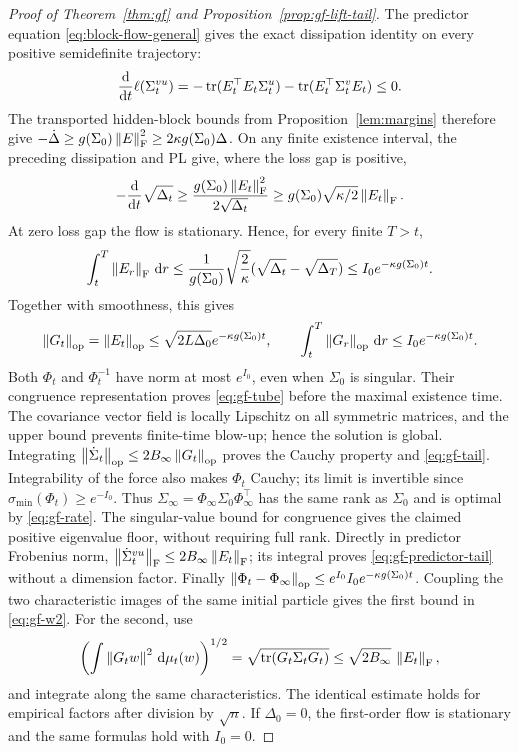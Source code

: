 \begin{proof}[Proof of Theorem~\ref{thm:gf} and Proposition~\ref{prop:gf-lift-tail}]
The predictor equation \eqref{eq:block-flow-general} gives the exact
dissipation identity on every positive semidefinite trajectory:
\begin{equation}\label{eq:flow-dissipation}
\frac{\mathrm{d}}{\mathrm{d}t}\ell(\Sigma^{vu}_t)
=-\operatorname{tr}(E_t^\top E_t\Sigma^u_t)-\operatorname{tr}(E_t^\top\Sigma^v_tE_t)\le0.
\end{equation}
The transported hidden-block bounds from Proposition~\ref{lem:margins}
therefore give $-\dot\Delta\ge g(\Sigma_0)\left\lVert E \right\rVert_{\mathrm{F}}^2\ge2\kappa g(\Sigma_0)\Delta$.
On any finite existence interval, the preceding dissipation and PL give,
where the loss gap is positive,
\[
 -\frac{\mathrm{d}}{\mathrm{d} t}\sqrt{\Delta_t}
 \ge\frac{g(\Sigma_0)\left\lVert E_t \right\rVert_{\mathrm{F}}^2}{2\sqrt{\Delta_t}}
 \ge g(\Sigma_0)\sqrt{\kappa/2}\left\lVert E_t \right\rVert_{\mathrm{F}}.
\]
At zero loss gap the flow is stationary. Hence, for every finite $T>t$,
\[
 \int_t^T\left\lVert E_r \right\rVert_{\mathrm{F}}\,\mathrm{d} r
 \le\frac1{g(\Sigma_0)}\sqrt{\frac2\kappa}
       (\sqrt{\Delta_t}-\sqrt{\Delta_T})
 \le I_0e^{-\kappa g(\Sigma_0)t}.
\]
Together with smoothness, this gives
\begin{equation}\label{eq:force-tail}
 \left\lVert G_t \right\rVert_{\mathrm{op}}=\left\lVert E_t \right\rVert_{\mathrm{op}}
 \le\sqrt{2L\Delta_0}e^{-\kappa g(\Sigma_0)t},\qquad
 \int_t^T\left\lVert G_r \right\rVert_{\mathrm{op}}\,\mathrm{d} r\le I_0e^{-\kappa g(\Sigma_0)t}.
\end{equation}
Both $\Phi_t$ and $\Phi_t^{-1}$ have norm at most $e^{I_0}$, even when
$\Sigma_0$ is singular. Their congruence representation proves
\eqref{eq:gf-tube} before the maximal existence time. The covariance vector
field is locally Lipschitz on all symmetric matrices, and the upper bound
prevents finite-time blow-up; hence the solution is global.
Integrating $\left\lVert \dot\Sigma_t \right\rVert_{\mathrm{op}}\le2B_\infty\left\lVert G_t \right\rVert_{\mathrm{op}}$
proves the Cauchy property and \eqref{eq:gf-tail}. Integrability of the
force also makes $\Phi_t$ Cauchy; its limit is invertible since
$\sigma_{\min}(\Phi_t)\ge e^{-I_0}$.
Thus $\Sigma_\infty=\Phi_\infty\Sigma_0\Phi_\infty^\top$ has the same
rank as $\Sigma_0$ and is optimal by \eqref{eq:gf-rate}.
The singular-value bound for congruence gives the claimed positive
eigenvalue floor, without requiring full rank.
Directly in predictor Frobenius norm,
$\left\lVert \dot{\Sigma}^{vu}_t \right\rVert_{\mathrm{F}}\le2B_\infty\left\lVert E_t \right\rVert_{\mathrm{F}}$;
its integral proves \eqref{eq:gf-predictor-tail} without a dimension factor.
Finally $\left\lVert \Phi_t-\Phi_\infty \right\rVert_{\mathrm{op}}\le e^{I_0}I_0e^{-\kappa g(\Sigma_0)t}$.
Coupling the two characteristic images of the same initial particle gives
the first bound in \eqref{eq:gf-w2}. For the second, use
\[
 \left(\int\left\lVert G_t w \right\rVert^2\,\mathrm{d}\mu_t(w)\right)^{1/2}
 =\sqrt{\operatorname{tr}(G_t\Sigma_tG_t)}
 \le\sqrt{2B_\infty}\,\left\lVert E_t \right\rVert_{\mathrm{F}},
\]
and integrate along the same characteristics. The identical estimate
holds for empirical factors after division by $\sqrt n$.
If $\Delta_0=0$, the first-order flow is stationary and
the same formulas hold with $I_0=0$.
\end{proof}
